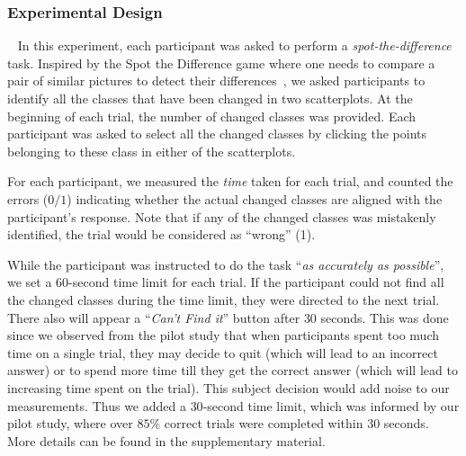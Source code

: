 
\subsubsection{Experimental Design}
\
\newline
\vspace{.3em}
In this experiment, each participant was asked to perform a \emph{spot-the-difference} task. Inspired by the Spot the Difference game where one needs to compare a pair of similar pictures to detect their differences~\cite{Fukuba2009}, we asked participants to identify all the classes that have been changed in two scatterplots. At the beginning of each trial, the number of changed classes was provided. Each participant was asked to select all the changed classes by clicking the points belonging to these class in either of the scatterplots.

For each participant, we measured the \emph{time} taken for each trial, and counted the errors ($0/1$) indicating whether the actual changed classes are aligned with the participant's response. Note that if any of the changed classes was mistakenly identified, the trial would be considered as ``wrong'' (1).

While the participant was instructed to do the task ``\emph{as accurately as possible}'', we set a $60$-second time limit for each trial. If the participant could not find all the changed classes during the time limit, they were directed to the next trial. There also will appear a ``\emph{Can't Find it}'' button after $30$ seconds.
This was done since we observed from the pilot study that when participants spent too much time on a single trial, they may decide to quit (which will lead to an incorrect answer) or to spend more time till they get the correct answer (which will lead to increasing time spent on the trial). This subject decision would add noise to our measurements. Thus we added a $30$-second time limit, which was informed by our pilot study, where over $85\%$ correct trials were completed within $30$ seconds. More details can be found in the supplementary material.

